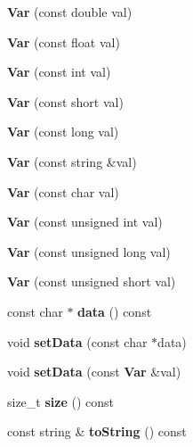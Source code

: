 \begin{CompactItemize}
\item 
\textbf{Var} (const double val)\label{classVar_802b20b083f5a93b334275d90feda6f9}

\item 
\textbf{Var} (const float val)\label{classVar_9ff95566445dfb743b663dbe671d8c0a}

\item 
\textbf{Var} (const int val)\label{classVar_ee9a4bd8d00e470de418d0a859418713}

\item 
\textbf{Var} (const short val)\label{classVar_d3167f908e6e8a355fab012cdcbef279}

\item 
\textbf{Var} (const long val)\label{classVar_cc94780272e98b0775418f72a0d3cbe2}

\item 
\textbf{Var} (const string \&val)\label{classVar_373f48cfb3c0c184126ee0858b8f1ef5}

\item 
\textbf{Var} (const char val)\label{classVar_7920f605b896012cdde5aaaf4183f798}

\item 
\textbf{Var} (const unsigned int val)\label{classVar_f7c9c5ffe3ba997d2d6f1799bc9caf81}

\item 
\textbf{Var} (const unsigned long val)\label{classVar_9bc36aaa458c72c026d55f4e9720bffa}

\item 
\textbf{Var} (const unsigned short val)\label{classVar_c242a7e6016df8215cd09f925b2e95e0}

\item 
const char $\ast$ \textbf{data} () const \label{classVar_cfb3b27d9a90b2278068c4c0616a7030}

\item 
void \textbf{setData} (const char $\ast$data)\label{classVar_d4ba277b09977dff02bfd967213b986b}

\item 
void \textbf{setData} (const {\bf Var} \&val)\label{classVar_19445862eb8d0a6ce594326754492548}

\item 
size\_\-t \textbf{size} () const \label{classVar_5128ee4ca9b4e868dff3724562413823}

\item 
const string \& \textbf{toString} () const \label{classVar_5ceac5f71482331f8d76135e94b7236b}


\end{CompactItemize}
